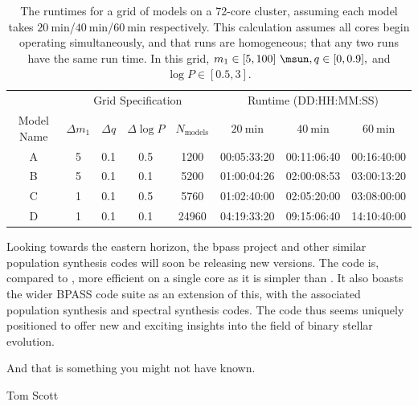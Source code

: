 \begin{table}[!htbp]
    \centering

    \begin{tabular}{c|cccc|ccc}
    \toprule
     & \multicolumn{4}{c|}{Grid Specification} & \multicolumn{3}{c}{Runtime (DD:HH:MM:SS)} \\
    Model Name & $\Delta m_1$ & $\Delta q$ & $\Delta \log P$ & $N_\text{models}$ & $\SI{20}{\minute}$ & $\SI{40}{\minute}$ & $\SI{60}{\minute}$ \\
    \midrule
        A & 5 & 0.1 & 0.5 & 1200  & 00:05:33:20 & 00:11:06:40 & 00:16:40:00 \\
        B & 5 & 0.1 & 0.1 & 5200  & 01:00:04:26 & 02:00:08:53 & 03:00:13:20 \\
        C & 1 & 0.1 & 0.5 & 5760  & 01:02:40:00 & 02:05:20:00 & 03:08:00:00 \\
        D & 1 & 0.1 & 0.1 & 24960 & 04:19:33:20 & 09:15:06:40 & 14:10:40:00 \\
    \bottomrule
    \end{tabular}

    \caption[The runtimes for a grid of  models on a 72-core cluster, assuming each model takes $\SI{20}{\minute}$/$\SI{40}{\minute}$/$\SI{60}{\minute}$ respectively.]{The runtimes for a grid of  models on a 72-core cluster, assuming each model takes $\SI{20}{\minute}$/$\SI{40}{\minute}$/$\SI{60}{\minute}$ respectively. This calculation assumes all cores begin operating simultaneously, and that runs are homogeneous; that any two runs have the same run time. In this grid, $m_1 \in [5, 100]~\unit{\msun}, q\in [0, 0.9],$ and $\log P\in[0.5, 3]$.}
    \label{tab:runtimes_for_full_grids}
\end{table}

Looking towards the eastern horizon, the \gls{bpass} project and other similar population synthesis codes will soon be releasing new versions. The  code is, compared to , more efficient on a single core as it is simpler than . It also boasts the wider BPASS code suite as an extension of this, with the associated population synthesis and spectral synthesis codes. The  code thus seems uniquely positioned to offer new and exciting insights into the field of binary stellar evolution.

\epigraph{And that is something you might not have known.}{Tom Scott}